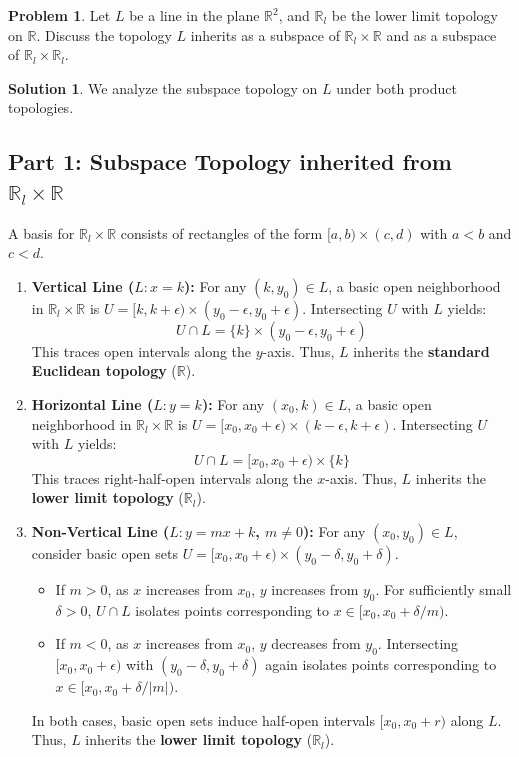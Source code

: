 \documentclass[11pt, a4paper]{article}
\theoremstyle{definition}
\newtheorem{problem}{Problem}
\newtheorem*{solution}{Solution}
\begin{document}
\setcounter{problem}{5}

\begin{problem}
Let $L$ be a line in the plane $\mathbb{R}^2$, and $\mathbb{R}_l$ be the lower limit topology on $\mathbb{R}$. Discuss the topology $L$ inherits as a subspace of $\mathbb{R}_l \times \mathbb{R}$ and as a subspace of $\mathbb{R}_l \times \mathbb{R}_l$.
\end{problem}

\begin{solution}
We analyze the subspace topology on $L$ under both product topologies.

\subsection*{Part 1: Subspace Topology inherited from $\mathbb{R}_l \times \mathbb{R}$}
A basis for $\mathbb{R}_l \times \mathbb{R}$ consists of rectangles of the form $[a, b) \times (c, d)$ with $a < b$ and $c < d$.

\begin{enumerate}[label=(\alph*)]
    \item \textbf{Vertical Line ($L: x = k$):}
    For any $(k, y_0) \in L$, a basic open neighborhood in $\mathbb{R}_l \times \mathbb{R}$ is $U = [k, k+\epsilon) \times (y_0-\epsilon, y_0+\epsilon)$. Intersecting $U$ with $L$ yields:
    \[
    U \cap L = \{k\} \times (y_0-\epsilon, y_0+\epsilon)
    \]
    This traces open intervals along the $y$-axis. Thus, $L$ inherits the \textbf{standard Euclidean topology} ($\mathbb{R}$).

    \item \textbf{Horizontal Line ($L: y = k$):}
    For any $(x_0, k) \in L$, a basic open neighborhood in $\mathbb{R}_l \times \mathbb{R}$ is $U = [x_0, x_0+\epsilon) \times (k-\epsilon, k+\epsilon)$. Intersecting $U$ with $L$ yields:
    \[
    U \cap L = [x_0, x_0+\epsilon) \times \{k\}
    \]
    This traces right-half-open intervals along the $x$-axis. Thus, $L$ inherits the \textbf{lower limit topology} ($\mathbb{R}_l$).

    \item \textbf{Non-Vertical Line ($L: y = mx + k$, $m \neq 0$):}
    For any $(x_0, y_0) \in L$, consider basic open sets $U = [x_0, x_0+\epsilon) \times (y_0-\delta, y_0+\delta)$.
    \begin{itemize}
        \item If $m > 0$, as $x$ increases from $x_0$, $y$ increases from $y_0$. For sufficiently small $\delta > 0$, $U \cap L$ isolates points corresponding to $x \in [x_0, x_0 + \delta/m)$.
        \item If $m < 0$, as $x$ increases from $x_0$, $y$ decreases from $y_0$. Intersecting $[x_0, x_0+\epsilon)$ with $(y_0-\delta, y_0+\delta)$ again isolates points corresponding to $x \in [x_0, x_0 + \delta/|m|)$.
    \end{itemize}
    In both cases, basic open sets induce half-open intervals $[x_0, x_0 + r)$ along $L$. Thus, $L$ inherits the \textbf{lower limit topology} ($\mathbb{R}_l$).
\end{enumerate}


\end{solution}
\end{document}
